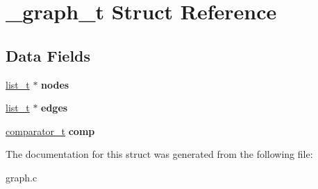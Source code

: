 \hypertarget{struct__graph__t}{}\section{\+\_\+graph\+\_\+t Struct Reference}
\label{struct__graph__t}
\subsection*{Data Fields}
\begin{DoxyCompactItemize}
\item 
\hypertarget{struct__graph__t_ab86e396ebcfbb265a86c2b6eb0864d28}{}\hyperlink{struct__list__t}{list\+\_\+t} $\ast$ {\bfseries nodes}\label{struct__graph__t_ab86e396ebcfbb265a86c2b6eb0864d28}

\item 
\hypertarget{struct__graph__t_a53976af64ae8e55c420f3e2c094a1eda}{}\hyperlink{struct__list__t}{list\+\_\+t} $\ast$ {\bfseries edges}\label{struct__graph__t_a53976af64ae8e55c420f3e2c094a1eda}

\item 
\hypertarget{struct__graph__t_a905fe101070b8d9260af6d2dd8506868}{}\hyperlink{util_8h_a49b4e67d12d0b82395b75063127fff0b}{comparator\+\_\+t} {\bfseries comp}\label{struct__graph__t_a905fe101070b8d9260af6d2dd8506868}

\end{DoxyCompactItemize}


The documentation for this struct was generated from the following file\+:\begin{DoxyCompactItemize}
\item 
graph.\+c\end{DoxyCompactItemize}
